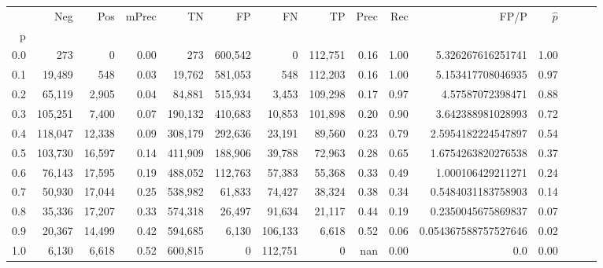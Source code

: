 \begin{tabular}{rrrrrrrrrrrrrrr}
\toprule
{} &      Neg &     Pos & mPrec &       TN &       FP &       FN &       TP &  Prec &   Rec &                  FP/P & $\hat{p}$ \\
p   &          &         &       &          &          &          &          &       &       &                       &           \\
\midrule
0.0 &      273 &       0 &  0.00 &      273 &  600,542 &        0 &  112,751 &  0.16 &  1.00 &     5.326267616251741 &      1.00 \\
0.1 &   19,489 &     548 &  0.03 &   19,762 &  581,053 &      548 &  112,203 &  0.16 &  1.00 &     5.153417708046935 &      0.97 \\
0.2 &   65,119 &   2,905 &  0.04 &   84,881 &  515,934 &    3,453 &  109,298 &  0.17 &  0.97 &      4.57587072398471 &      0.88 \\
0.3 &  105,251 &   7,400 &  0.07 &  190,132 &  410,683 &   10,853 &  101,898 &  0.20 &  0.90 &     3.642388981028993 &      0.72 \\
0.4 &  118,047 &  12,338 &  0.09 &  308,179 &  292,636 &   23,191 &   89,560 &  0.23 &  0.79 &    2.5954182224547897 &      0.54 \\
0.5 &  103,730 &  16,597 &  0.14 &  411,909 &  188,906 &   39,788 &   72,963 &  0.28 &  0.65 &    1.6754263820276538 &      0.37 \\
0.6 &   76,143 &  17,595 &  0.19 &  488,052 &  112,763 &   57,383 &   55,368 &  0.33 &  0.49 &     1.000106429211271 &      0.24 \\
0.7 &   50,930 &  17,044 &  0.25 &  538,982 &   61,833 &   74,427 &   38,324 &  0.38 &  0.34 &    0.5484031183758903 &      0.14 \\
0.8 &   35,336 &  17,207 &  0.33 &  574,318 &   26,497 &   91,634 &   21,117 &  0.44 &  0.19 &    0.2350045675869837 &      0.07 \\
0.9 &   20,367 &  14,499 &  0.42 &  594,685 &    6,130 &  106,133 &    6,618 &  0.52 &  0.06 &  0.054367588757527646 &      0.02 \\
1.0 &    6,130 &   6,618 &  0.52 &  600,815 &        0 &  112,751 &        0 &   nan &  0.00 &                   0.0 &      0.00 \\
\bottomrule
\end{tabular}
